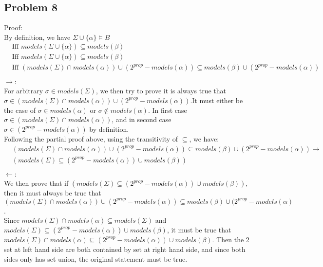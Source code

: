 \documentclass[12pt]{article}
\begin{document}
\subsection*{Problem 8}
Proof:\\[10pt]
By definition, we have $\Sigma \cup \{\alpha\} \models B$\\
\begin{align*}
    &\text{Iff } models(\Sigma \cup \{\alpha\}) \subseteq models(\beta)\\
    &\text{Iff } models(\Sigma \cup \{\alpha\}) \subseteq models(\beta)\\
    &\text{Iff } (models(\Sigma) \cap models(\alpha)) \cup (2^{prop} - models(\alpha)) \subseteq models(\beta) \cup (2^{prop} - models(\alpha))\\
\end{align*}
$\longrightarrow$:\\
For arbitrary $\sigma \in models(\Sigma)$, we then try to prove it is always true that $\sigma \in (models(\Sigma) \cap models(\alpha)) \cup (2^{prop} - models(\alpha))$.It must either be the case of $\sigma \in models(\alpha)$ or $\sigma \notin models(\alpha)$. In first case $\sigma \in (models(\Sigma) \cap models(\alpha))$, and in second case $\sigma \in (2^{prop} - models(\alpha))$ by definition.\\[3pt]
Following the partial proof above, using the transitivity of $\subseteq$, we have:
\begin{align*}
    &(models(\Sigma) \cap models(\alpha)) \cup (2^{prop} - models(\alpha)) \subseteq models(\beta) \cup (2^{prop} - models(\alpha))\rightarrow \\
    &(models(\Sigma) \subseteq (2^{prop} - models(\alpha)) \cup models(\beta))\\
\end{align*}
$\longleftarrow$:\\
We then prove that if $(models(\Sigma) \subseteq (2^{prop} - models(\alpha)) \cup models(\beta))$, then it must always be true that $(models(\Sigma) \cap models(\alpha)) \cup (2^{prop} - models(\alpha)) \subseteq models(\beta) \cup (2^{prop} - models(\alpha)$.\\
Since $models(\Sigma) \cap models(\alpha) \subseteq models(\Sigma)$ and $models(\Sigma) \subseteq (2^{prop} - models(\alpha)) \cup models(\beta)$, it must be true that $models(\Sigma) \cap models(\alpha) \subseteq (2^{prop} - models(\alpha)) \cup models(\beta)$. Then the 2 set at left hand side are both contained by set at right hand side, and since both sides only has set union, the original statement must be true. \\[10pt]
\end{document}
